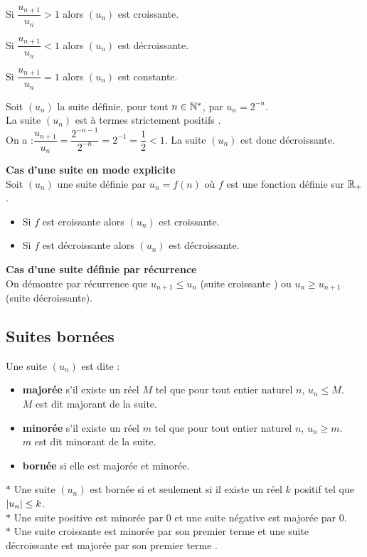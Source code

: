 Si $ \dfrac{u_{n+1}}{u_{n}}>1 $ alors $(u_{n})$ est croissante.

Si $ \dfrac{u_{n+1}}{u_{n}}<1 $ alors $(u_{n})$ est décroissante.

Si $ \dfrac{u_{n+1}}{u_{n}}=1 $ alors $(u_{n})$ est constante.

\begin{example}
Soit $(u_{n})$ la suite définie, pour tout $n\in \mathbb{N}^* $, par $ u_{n}=2^{-n} $.\\ La suite $(u_{n})$ est à termes strictement positifs .\\
On a :$ \dfrac{u_{n+1}}{u_{n}}=\dfrac{2^{-n-1}}{2^{-n}}=2^{-1}=\dfrac{1}{2}<1 $.
 La suite  $(u_{n})$  est donc décroissante.
\end{example}

\textbf{Cas d'une suite en mode explicite }\\
Soit $(u_{n})$ une suite définie par $ u_{n} = f (n) $ où $f$ est une fonction définie sur $ \mathbb{R}_+ $.
\begin{itemize}
\item[\textbullet] Si $ f $ est croissante alors $(u_{n})$ est croissante.
 \item[\textbullet] Si $ f $ est décroissante alors $(u_{n})$ est décroissante.
\end{itemize}
\textbf{Cas d'une suite définie  par récurrence}\\
On  démontre par récurrence que  $u_{n+1}\leq u_{n}$ (suite croissante ) ou $ u_{n}\geq u_{n+1} $ (suite décroissante).
\subsection*{Suites bornées}
\begin{definition}
Une suite $(u_{n})$ est dite : 
\begin{itemize}
\item[\textbullet]  \textbf{\color{magenta} majorée} s'il existe un réel $ M $ tel que pour tout entier naturel $ n $, $ u_{n}\leq M $.\\ $ M $ est dit majorant de la suite.
\item[\textbullet] \textbf{\color{magenta} minorée} s'il existe un réel $ m $ tel que pour tout entier naturel $ n $, $ u_{n}\geq m $.\\ $ m $ est dit minorant de la suite.
\item[\textbullet] \textbf{\color{magenta} bornée} si elle est majorée et minorée.
\end{itemize}
\end{definition}
\begin{remark}
$ \ast $ Une suite $(u_{n})$ est bornée si et seulement si il existe un réel $ k $ positif tel que $ \left\lvert u_{n} \right\rvert \leq k$.\\
$ \ast $ Une suite positive est minorée par $ 0 $ et une suite négative est majorée par $ 0 $.\\
$ \ast $ Une suite croissante est minorée par son premier terme et une suite décroissante est majorée par son  premier terme .
\end{remark}
